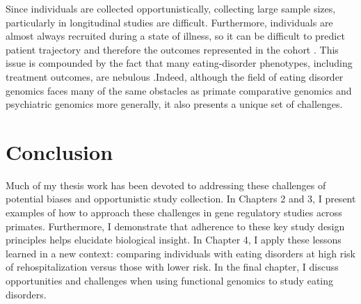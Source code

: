 Since individuals are collected opportunistically, collecting large sample sizes, particularly in longitudinal studies are difficult. Furthermore, individuals are almost always recruited during a state of illness, so it can be difficult to predict patient trajectory and therefore the outcomes represented in the cohort \cite{RN4514}. This issue is compounded by the fact that many eating-disorder phenotypes, including treatment outcomes, are nebulous \cite{RN4543}.Indeed, although the field of eating disorder genomics faces many of the same obstacles as primate comparative genomics and psychiatric genomics more generally, it also presents a unique set of challenges.

\section{Conclusion}
Much of my thesis work has been devoted to addressing these challenges of potential biases and opportunistic study collection. In Chapters 2 and 3, I present examples of how to approach these challenges in gene regulatory studies across primates. Furthermore, I demonstrate that adherence to these key study design principles helps elucidate biological insight. In Chapter 4, I apply these lessons learned in a new context: comparing individuals with eating disorders at high risk of rehospitalization versus those with lower risk. In the final chapter, I discuss opportunities and challenges when using functional genomics to study eating disorders. 
